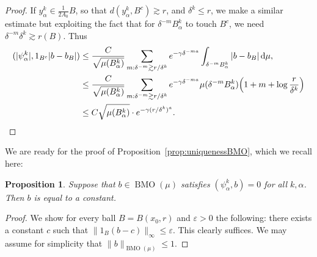 \documentclass{amsart}
\numberwithin{equation}{section}
\theoremstyle{plain}
\newtheorem{proposition}[equation]{Proposition}
\theoremstyle{definition}
\theoremstyle{remark}
\begin{document}
{{{\begin{proof}
If $y^k_\alpha\in\frac{1}{2A_0}B$, so that $d(y^k_\alpha,B^c)\gtrsim r$, and $\delta^k\leq r$, we make a similar estimate but exploiting the fact that for $\delta^{-m}B^k_\alpha$ to touch $B^c$, we need $\delta^{-m}\delta^k\gtrsim r(B)$. Thus
\begin{equation*}
\begin{split}
  ({|{\psi^k_\alpha}|},1_{B^c}{|{b-b_B}|})
   &\leq \frac{C}{\sqrt{\mu(B^k_\alpha)}}\sum_{m:\delta^{-m}\gtrsim r/\delta^k}e^{-\gamma\delta^{-ma}}\int_{\delta^{-m}B^k_\alpha}{|{b-b_B}|}{\,\mathrm{d}}\mu, \\
   &\leq \frac{C}{\sqrt{\mu(B^k_\alpha)}}\sum_{m:\delta^{-m}\gtrsim r/\delta^k}e^{-\gamma\delta^{-ma}}\mu(\delta^{-m}B^k_\alpha)\Big(1+m+\log\frac{r}{\delta^k}\Big) \\
   &\leq C\sqrt{\mu(B^k_\alpha)}\cdot e^{-\gamma (r/\delta^k)^a}.\qedhere
\end{split}
\end{equation*}
\end{proof}

We are ready for the proof of Proposition~\ref{prop:uniquenessBMO}, which we recall here:

\begin{proposition}
Suppose that $b\in{\operatorname{BMO}}(\mu)$ satisfies $(\psi^k_\alpha,b)=0$ for all $k,\alpha$. Then $b$ is equal to a constant.
\end{proposition}

\begin{proof}
We show for every ball $B=B(x_0,r)$ and $\varepsilon>0$ the following: there exists a constant $c$ such that ${\|{1_B(b-c)}\|_{{\infty}}}\leq\varepsilon$. This clearly suffices. We may assume for simplicity that ${\|{b}\|_{{{\operatorname{BMO}}(\mu)}}}\leq 1$.


\end{proof}}}}
\end{document}
